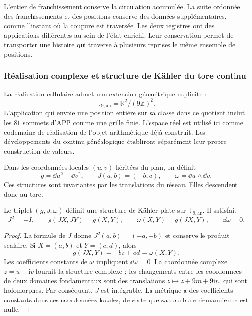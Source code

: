 L'entier de franchissement conserve la circulation accumulée. La suite ordonnée des franchissements et des positions conserve des données supplémentaires, comme l'instant où la coupure est traversée. Les deux registres ont des applications différentes au sein de l'état enrichi. Leur conservation permet de transporter une histoire qui traverse à plusieurs reprises le même ensemble de positions.

\subsubsection{Réalisation complexe et structure de Kähler du tore continu}
\label{geo:kahler}

La réalisation cellulaire admet une extension géométrique explicite :
\[
 \mathbb T_{9,\mathrm{an}}=\mathbb R^2/(9\mathbb Z)^2.
\]
L'application qui envoie une position entière sur sa classe dans ce quotient inclut les $81$ sommets d'APP comme une grille finie. L'espace réel est utilisé ici comme codomaine de réalisation de l'objet arithmétique déjà construit. Les développements du continu généalogique établiront séparément leur propre construction de valeurs.

Dans les coordonnées locales $(u,v)$ héritées du plan, on définit
\[
 g=\dd u^2+\dd v^2,\qquad
 J(a,b)=(-b,a),\qquad
 \omega=\dd u\wedge\dd v.
\]
Ces structures sont invariantes par les translations du réseau. Elles descendent donc au tore.

\begin{proposicion}
\label{geo:prop-kahler}
Le triplet $(g,J,\omega)$ définit une structure de Kähler plate sur $\mathbb T_{9,\mathrm{an}}$. Il satisfait
\[
 J^2=-I,\qquad g(JX,JY)=g(X,Y),\qquad
 \omega(X,Y)=g(JX,Y),\qquad \dd\omega=0.
\]
\end{proposicion}

\begin{proof}
La formule de $J$ donne $J^2(a,b)=(-a,-b)$ et conserve le produit scalaire. Si $X=(a,b)$ et $Y=(c,d)$, alors
\[
 g(JX,Y)=-bc+ad=\omega(X,Y).
\]
Les coefficients constants de $\omega$ impliquent $\dd\omega=0$. La coordonnée complexe $z=u+\mathrm i v$ fournit la structure complexe ; les changements entre les coordonnées de deux domaines fondamentaux sont des translations $z\mapsto z+9m+9\mathrm i n$, qui sont holomorphes. Par conséquent, $J$ est intégrable. La métrique a des coefficients constants dans ces coordonnées locales, de sorte que sa courbure riemannienne est nulle.
\end{proof}

